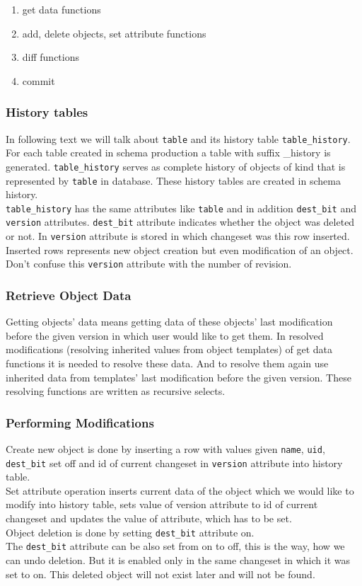 \documentclass[deska]{subfiles}
\begin{document}
\begin{enumerate}
    \item get data functions
    \item add, delete objects, set attribute functions
    \item diff functions
    \item commit
\end{enumerate}

\subsubsection{History tables}
In following text we will talk about {\tt table} and its history table {\tt table\_history}.\\
For each table created in schema production a table with suffix \_history is generated. {\tt table\_history} serves as complete history of objects of kind that is represented by {\tt table} in database. These history tables are created in schema history.\\
{\tt table\_history} has the same attributes like {\tt table} and in addition {\tt dest\_bit} and {\tt version} attributes. {\tt dest\_bit} attribute indicates whether the object was deleted or not. In {\tt version} attribute is stored in which changeset was this row inserted. Inserted rows represents new object creation but even modification of an object. Don't confuse this {\tt version} attribute with the number of revision.

\subsubsection{Retrieve Object Data}
Getting objects' data means getting data of these objects' last modification before the given version in which user would like to get them.
In resolved modifications (resolving inherited values from object templates) of get data functions it is needed to resolve these data. And to resolve them again use inherited data from templates' last modification before the given version.
These resolving functions are written as recursive selects.

\subsubsection{Performing Modifications}
Create new object is done by inserting a row with values given {\tt name}, {\tt uid}, {\tt dest\_bit} set off and id of current changeset in {\tt version} attribute into history table.\\
Set attribute operation inserts current data of the object which we would like to modify into history table, sets value of version attribute to id of current changeset and updates the value of attribute, which has to be set.\\
Object deletion is done by setting {\tt dest\_bit} attribute on.\\
The {\tt dest\_bit} attribute can be also set from on to off, this is the way, how we can undo deletion. But it is enabled only in the same changeset in which it was set to on. This deleted object will not exist later and will not be found.
\end{document}
